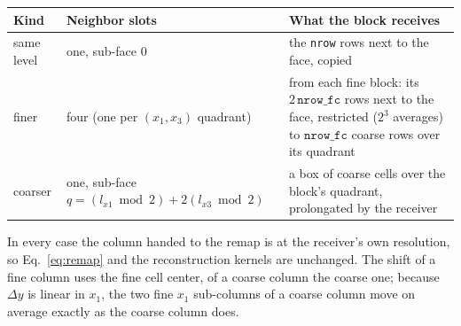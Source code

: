 \documentclass[11pt]{article}
\newcommand{\code}[1]{\texttt{#1}}
\begin{document}
\begin{center}
\small
\begin{tabular}{@{}lp{4.8cm}p{6.4cm}@{}}
\toprule
Kind & Neighbor slots & What the block receives \\
\midrule
same level & one, sub-face 0 & the \code{nrow} rows next to the face, copied \\
finer & four (one per $(x_1,x_3)$ quadrant) & from each fine block: its
  $2\,\code{nrow\_fc}$ rows next to the face, restricted ($2^3$ averages) to
  $\code{nrow\_fc}$ coarse rows over its quadrant \\
coarser & one, sub-face $q = (l_{x1}\bmod2) + 2(l_{x3}\bmod2)$ & a box of coarse cells
  over the block's quadrant, prolongated by the receiver \\
\bottomrule
\end{tabular}
\end{center}

\noindent
In every case the column handed to the remap is at the receiver's own resolution, so
Eq.~\eqref{eq:remap} and the reconstruction kernels are unchanged. The shift of a fine
column uses the fine cell center, of a coarse column the coarse one; because $\Delta y$ is
linear in $x_1$, the two fine $x_1$ sub-columns of a coarse column move on average exactly
as the coarse column does.
\end{document}
